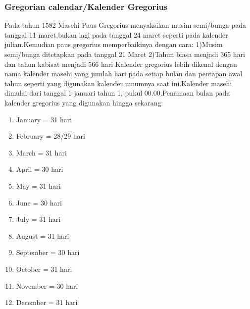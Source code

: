     \subsubsection{Gregorian calendar/Kalender Gregorius}
      Pada tahun 1582 Masehi Paus Gregorius menyaksikan musim semi/bunga pada tanggal 11 maret,bukan lagi pada tanggal 24 maret seperti pada kalender julian.Kemudian paus gregorius memperbaikinya dengan cara:
      1)Musim semi/bunga ditetapkan pada tanggal 21 Maret
      2)Tahun biasa menjadi 365 hari dan tahun kabisat menjadi 566 hari
      Kalender gregorius lebih dikenal dengan nama kalender masehi yang jumlah hari pada setiap bulan dan pentapan awal tahun seperti yang digunakan kalender umumnya saat ini.Kalender masehi dimulai dari tanggal 1 januari
      tahun 1, pukul 00.00.Penamaan bulan pada kalender gregorius yang digunakan hingga sekarang:
      \begin{enumerate}
        \item  January   = 31 hari
        \item  February  = 28/29 hari
        \item  March     = 31 hari
        \item  April     = 30 hari
        \item  May       = 31 hari
        \item  June      = 30 hari
        \item  July      = 31 hari
        \item  August    = 31 hari
        \item  September = 30 hari
        \item  October  = 31 hari
        \item  November = 30 hari
        \item  December = 31 hari
      \end{enumerate}

